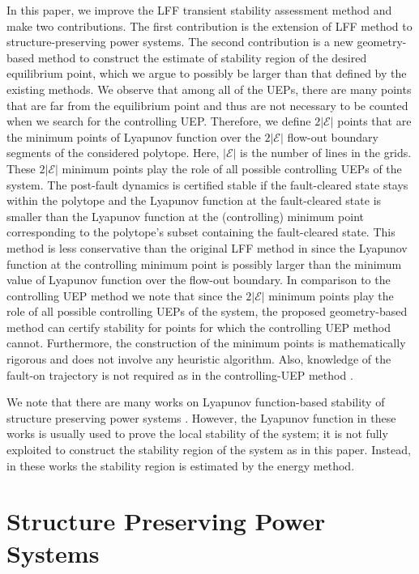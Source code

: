 \documentclass[final]{IEEEtran}
\begin{document}
In this paper, we improve the LFF transient stability assessment method and make two contributions. The first contribution is the extension of
LFF method to structure-preserving power systems. The second contribution is a new geometry-based method
to construct the estimate of stability region of the desired equilibrium point, which we argue to possibly be larger than that defined by the existing methods. We observe that among all of the UEPs, there are many points that are far from the equilibrium point and thus are not necessary to be counted when we search for the controlling UEP. Therefore, we define $2|\mathcal{E}|$ points that are the minimum points of Lyapunov function over the $2|\mathcal{E}|$ flow-out boundary segments of the considered polytope. Here, $|\mathcal{E}|$ is the number of lines in the grids. These $2|\mathcal{E}|$ minimum points play the role of all possible controlling UEPs of the system. The post-fault dynamics is certified stable
if the fault-cleared state stays within the polytope and the Lyapunov function at the fault-cleared state is smaller than the Lyapunov function at the (controlling) minimum point corresponding to the polytope's subset containing the fault-cleared state. This method is less conservative than the original LFF method in \cite{Vu:2014} since the Lyapunov function at the controlling minimum point is possibly larger than the minimum value of Lyapunov function over the flow-out boundary. In comparison to the controlling UEP method we note that since the $2|\mathcal{E}|$ minimum points play the role of all possible controlling UEPs of the system, the proposed geometry-based method can certify stability for points for which the controlling UEP method cannot. Furthermore, the construction of the minimum points is mathematically rigorous and does not involve any heuristic algorithm. Also, knowledge of the fault-on trajectory is not required as in the controlling-UEP method \cite{Zou:2003ji}.     


We note that there are many works on Lyapunov function-based stability of structure preserving power systems
\cite{bergen1981structure,Hiskens:1997Lya,hill1989lyapunov}. However, the Lyapunov function in these works is usually used to prove the local stability of the
system; it is not fully exploited to construct the stability region of the system as in this paper. Instead, in these works the stability region is estimated by the energy method.




\section{Structure Preserving Power Systems}
\label{sec:structure-preserving}
\end{document}
